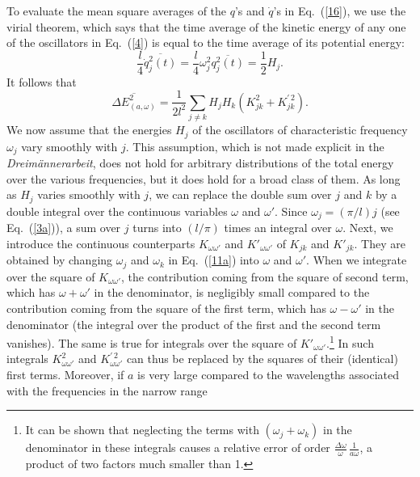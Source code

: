 \documentclass{elsart}
\begin{document}
To evaluate the mean square averages of the $q$'s and $\dot{q}$'s in Eq.\ (\ref{16}), we use the virial theorem, which says that the time average of the kinetic energy of any one of the oscillators in Eq.\ (\ref{4}) is equal to the time average of its potential energy:
\begin{equation}
\frac{l}{4} \overline{ \dot{q}_j^2(t) } = \frac{l}{4} \omega_j^2 \overline {q_j^2(t)} = \frac{1}{2} H_j.
\label{16b}
\end{equation}
It follows that
\begin{equation}
\overline{\Delta E_{(a, \omega)}^2}  =
 \frac{1}{2l^2} \sum_{j \neq k} H_j H_k \left( K^2_{jk} + K^{\prime \, 2}_{jk} \right).
\label{q14}
\end{equation}
We now assume 
that the energies $H_j$ of the oscillators of characteristic frequency $\omega_j$ vary smoothly with $j$. This assumption, which is not made explicit in the {\it Dreim\"annerarbeit}, does not hold for arbitrary distributions of the total energy over the various frequencies, but it does hold for a broad class of them.
As long as $H_j$ varies smoothly with $j$, we can replace the double sum over $j$ and $k$ by a double integral over the continuous variables $\omega$ and $\omega'$. Since $\omega_j = (\pi/l) j$ (see Eq.\ (\ref{3a})), a sum over $j$ turns into $(l/\pi)$ times an integral over $\omega$. Next, we introduce the continuous counterparts $K_{\omega \omega'}$ and $K'_{\omega \omega'}$ of $K_{jk}$ and $K'_{jk}$. They are obtained by changing $\omega_j$ and $\omega_k$ in Eq.\ (\ref{11a}) into $\omega$ and $\omega'$.
When we integrate over the square of $K_{\omega \omega'}$, the contribution coming from the square of second term, which has $\omega + \omega'$ in the denominator, is negligibly small compared to the contribution coming from the square of the first term, which has $\omega - \omega'$ in the denominator (the integral over the product of the first and the second term vanishes). The same is true for integrals over the square of $K'_{\omega \omega'}$.\footnote{It can be shown that neglecting the terms with $(\omega_j + \omega_k)$ in the denominator in these integrals causes a relative error of order $\displaystyle{ \frac{\Delta\omega}{\omega}\, \frac{1}{a\omega}}$, a product of two factors much smaller than 1.\label{small}} In such integrals $K^2_{\omega \omega'}$ and $K^{\prime \, 2}_{\omega \omega'}$ can thus be replaced by the squares of their (identical) first terms. Moreover, if $a$ is very large compared to the wavelengths associated with the frequencies in the narrow range 
\end{document}
